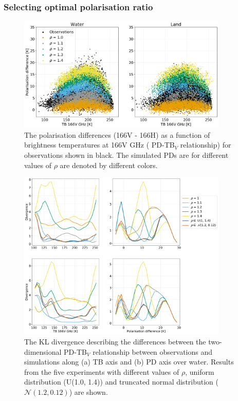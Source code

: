 \documentclass[amt, manuscript]{copernicus}
\begin{document}
\subsubsection{Selecting optimal polarisation ratio}
%
\begin{figure}[t]
	\includegraphics[width=10cm]{Figures/PD_water_varying_rho_water_land.png}
	\caption{The polarisation differences (166V - 166H) as a function of brightness temperatures at 166V GHz ( PD-TB$_V$ relationship) for observations shown in black. The simulated PDs are for different values of $\rho$ are denoted by different colors. }
	\label{fig:PD_166}
\end{figure}
\begin{figure}[t]
	\includegraphics[width=10cm]{Figures/divergence_land_water.pdf}
	\caption{The KL divergence describing the differences between the two-dimensional PD-TB$_V$ relationship between observations and simulations along (a) TB axis and (b) PD axis over water. Results from the five experiments with different values of $\rho$, uniform distribution (U(1.0, 1.4)) and truncated normal distribution ($\mathcal{N(1.2, 0.12)}$) are shown. }
	\label{fig:divergence_PD_land_water}
\end{figure}
\end{document}
